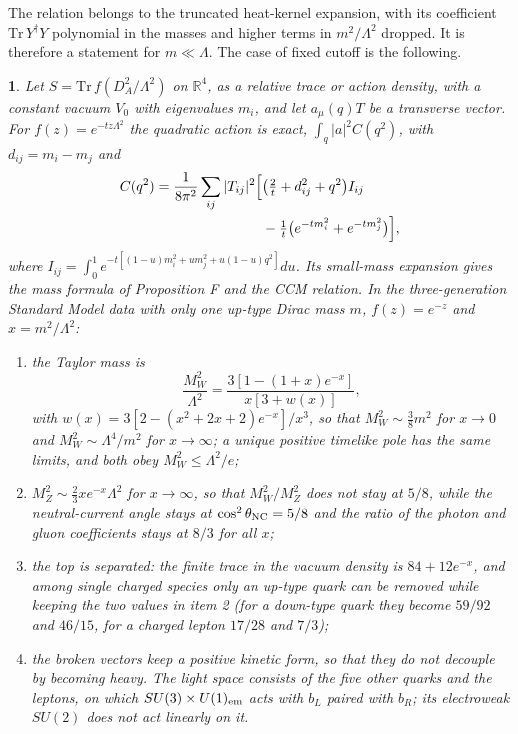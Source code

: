 \documentclass[aps,prd,reprint,onecolumn,nofootinbib,amsmath,amssymb,floatfix]{revtex4-2}
\theoremstyle{plain}
\newcommand{\resultname}{}
\newtheorem*{resultenv}{\resultname}
\newenvironment{result}[1]{\renewcommand{\resultname}{#1}\begin{resultenv}}{\end{resultenv}}
\begin{document}
The relation belongs to the truncated heat-kernel expansion, with its coefficient $\mathrm{Tr}\,Y^\dagger Y$ polynomial in the masses and higher terms in $m^2/\Lambda^2$ dropped. It is therefore a statement for $m\ll\Lambda$. The case of fixed cutoff is the following.

\begin{result}{Proposition E.1}
Let $S=\mathrm{Tr}\,f(D_A^2/\Lambda^2)$ on $\mathbb R^4$, as a relative trace or action density, with a constant vacuum $V_0$ with eigenvalues $m_i$, and let $a_\mu(q)T$ be a transverse vector. For $f(z)=e^{-tz\Lambda^2}$ the quadratic action is exact, $\int_q|a|^2C(q^2)$, with $d_{ij}=m_i-m_j$ and
\begin{equation}
\begin{split}
C(q^2)=\frac1{8\pi^2}\sum_{ij}|T_{ij}|^2\Bigl[&\bigl(\tfrac2t+d_{ij}^2+q^2\bigr)I_{ij}\\
&-\tfrac1t\bigl(e^{-tm_i^2}+e^{-tm_j^2}\bigr)\Bigr],
\end{split}
\end{equation}
where $I_{ij}=\int_0^1e^{-t[(1-u)m_i^2+um_j^2+u(1-u)q^2]}du$. Its small-mass expansion gives the mass formula of Proposition F and the CCM relation. In the three-generation Standard Model data with only one up-type Dirac mass $m$, $f(z)=e^{-z}$ and $x=m^2/\Lambda^2$:
\begin{enumerate}
\item the Taylor mass is
\begin{equation}
\frac{M_W^2}{\Lambda^2}=\frac{3[1-(1+x)e^{-x}]}{x[3+w(x)]},
\end{equation}
with $w(x)=3[2-(x^2+2x+2)e^{-x}]/x^3$, so that $M_W^2\sim\tfrac38m^2$ for $x\to0$ and $M_W^2\sim\Lambda^4/m^2$ for $x\to\infty$; a unique positive timelike pole has the same limits, and both obey $M_W^2\le\Lambda^2/e$;
\item $M_Z^2\sim\tfrac23xe^{-x}\Lambda^2$ for $x\to\infty$, so that $M_W^2/M_Z^2$ does not stay at $5/8$, while the neutral-current angle stays at $\cos^2\theta_{\rm NC}=5/8$ and the ratio of the photon and gluon coefficients stays at $8/3$ for all $x$;
\item the top is separated: the finite trace in the vacuum density is $84+12e^{-x}$, and among single charged species only an up-type quark can be removed while keeping the two values in item 2 (for a down-type quark they become $59/92$ and $46/15$, for a charged lepton $17/28$ and $7/3$);
\item the broken vectors keep a positive kinetic form, so that they do not decouple by becoming heavy. The light space consists of the five other quarks and the leptons, on which $SU(3)\times U(1)_{\rm em}$ acts with $b_L$ paired with $b_R$; its electroweak $SU(2)$ does not act linearly on it.
\end{enumerate}
\end{result}
\end{document}

